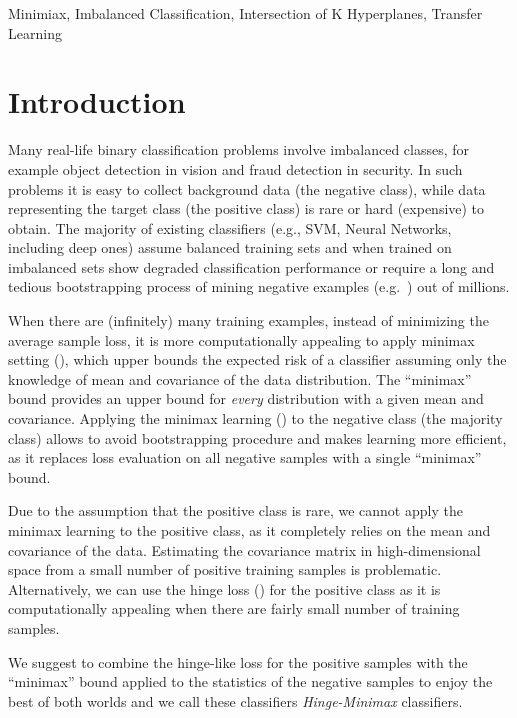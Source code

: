 \documentclass[twoside,11pt]{article}
\begin{document}
\begin{keywords}
  Minimiax, Imbalanced Classification, Intersection of K Hyperplanes, Transfer Learning
\end{keywords}

\section{Introduction}
Many real-life binary classification problems involve imbalanced classes, for example object detection in vision and fraud detection in security.  In such problems it is easy to collect background data (the negative class), while data representing the target class (the positive class) is rare or hard (expensive) to obtain. The majority of existing classifiers (e.g., SVM, Neural Networks, including deep ones) assume balanced training sets and when trained on imbalanced sets show degraded classification performance or require a long and tedious bootstrapping process of mining negative examples (e.g.~\cite{eSVM,ROSS}) out of millions.

When there are (infinitely) many training examples, instead of minimizing the average sample loss, it is more computationally appealing to apply minimax setting  (\cite{Lanckriet2003,Honorio14}), which upper bounds the expected risk of a classifier assuming only the knowledge of  mean and covariance of the data distribution. The ``minimax'' bound provides an upper bound for \emph{every} distribution with a given mean and covariance. Applying the minimax learning (\cite{Lanckriet2003}) to the negative class (the majority class) allows to avoid bootstrapping procedure and makes learning more efficient, as it replaces loss evaluation on all negative samples with a single ``minimax'' bound.

Due to the assumption that the positive class is rare, we cannot apply the minimax learning to the positive class, as it completely relies on the mean and covariance of the data. Estimating the covariance matrix in high-dimensional space from a small number of positive training samples is problematic.  Alternatively, we can use the hinge loss (\cite{Vapnik00,Zhang02,Bartlett03,Bousquet04,Kakade08}) for the positive class as it is computationally appealing when there are fairly small number of training samples.


We suggest to combine the hinge-like loss for the positive samples with the ``minimax'' bound applied to the statistics of the negative samples to enjoy the best of both worlds and we call these classifiers \emph{Hinge-Minimax} classifiers.
\end{document}
